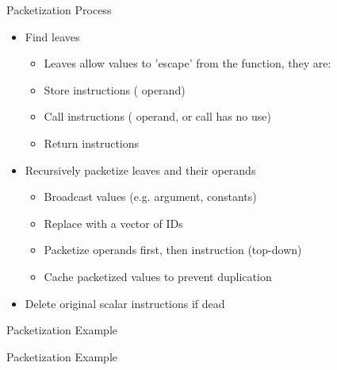 \begin{frame}{Packetization Process}

\begin{itemize}
    \item Find leaves
    \begin{itemize}
        \item Leaves allow  values to 'escape' from the function, they are:
        \item Store instructions ( operand)
        \item Call instructions ( operand, or call has no use)
        \item Return instructions
    \end{itemize}
\end{itemize}

\begin{itemize}
    \item Recursively packetize leaves and their operands
    \begin{itemize}
        \item Broadcast  values (e.g. argument, constants)
        \item Replace  with a vector of IDs
        \item Packetize operands first, then instruction (top-down)
        \item Cache packetized values to prevent duplication
    \end{itemize}
\end{itemize}

\begin{itemize}
    \item Delete original scalar instructions if dead
\end{itemize}

\end{frame}


\begin{frame}[c]{Packetization Example}


\end{frame}


\begin{frame}[c]{Packetization Example}


\end{frame}

